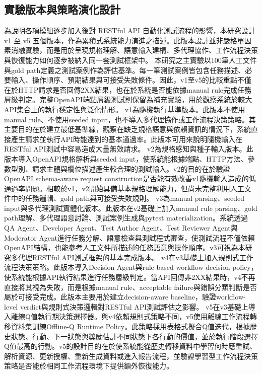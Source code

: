 \begin{ZhChapter}
\section{實驗版本與策略演化設計}
\text 為說明各項模組逐步加入後對 RESTful API 自動化測試流程的影響，本研究設計 v1 至 v5 五個版本，作為累積式系統能力演進之描述。此版本設計並非嚴格單因素消融實驗，而是用於呈現規格理解、語意輸入建構、多代理協作、工作流程決策與恢復能力如何逐步被納入同一套測試框架中。
\text 本研究之主實驗以100筆人工文件與gold path定義之測試案例作為評估基準。每一筆測試案例皆包含任務描述、必要輸入、操作順序、預期結果與可接受失敗條件。因此，v1至v5的比較重點不僅在於HTTP請求是否回傳2XX結果，也在於系統是否能依據manual rule完成任務層級判定。完整OpenAPI端點層級測試則保留為補充實驗，用於觀察系統於較大API集合上的執行穩定性與泛化情形。
\text v1為隨機執行基準版本。此版本不使用manual rule、不使用seeded input，也不導入多代理協作或工作流程決策策略。其主要目的在於建立最低基準線，觀察在缺乏規格語意與依賴資訊的情況下，系統直接產生請求並執行API時能達到的基本通過率。此版本可用來說明隨機輸入在RESTful API測試中容易造成大量無效請求。
\text v2為規格感知與種子輸入版本。此版本導入OpenAPI規格解析與seeded input，使系統能根據端點、HTTP方法、參數型別、請求主體與欄位描述產生較合理的測試輸入。v2的目的在於驗證OpenAPI schema-aware request construction是否能有效改善v1隨機輸入造成的低通過率問題。相較於v1，v2開始具備基本規格理解能力，但尚未完整利用人工文件中的任務邏輯、gold path與可接受失敗規則。
\text v3為manual parsing、seeded input與多代理測試實體化版本。此版本在v2基礎上加入manual rule parsing、gold path理解、多代理語意討論、測試案例生成與pytest materialization。系統透過QA Agent、Developer Agent、Test Author Agent、Test Reviewer Agent與Moderator Agent進行任務分解、語意檢查與測試程式審查，使測試流程不僅依賴OpenAPI結構，也能參考人工文件所描述的任務語意與操作順序。v3可視為本研究多代理RESTful API測試框架的基本完成版本。
\text v4在v3基礎上加入規則式工作流程決策策略。此版本導入Decision Agent與rule-based workflow decision policy，使系統能根據API執行結果進行任務層級判定。當API回傳非2XX結果時，v4不再直接將其視為失敗，而是根據manual rule、acceptable failure與錯誤分類判斷是否屬於可接受完成。此版本主要用於建立decision-aware baseline，驗證workflow-level verdict與規則式決策邏輯對RESTful API測試評估之影響。
\text v5在v3基礎上導入離線Q值執行期決策選擇器。與v4依賴規則式策略不同，v5使用離線工作流程轉移資料集訓練Offline-Q Runtime Policy。此策略採用表格式擬合Q值迭代，根據歷史狀態、行動、下一狀態與獎勵估計不同狀態下各行動的價值，並於執行階段選擇Q值最高的行動。v5的設計目的在於使系統能從歷史轉移資料中學習何時應重試、解析資源、更新授權、重新生成資料或進入報告流程，並驗證學習型工作流程決策策略是否能於相同工作流程環境下提供額外恢復能力。


\end{ZhChapter}
